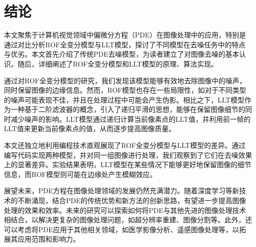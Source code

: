 \titleformat{\chapter}[hang]{\linespread{1}\heiti\sanhao\bfseries\filright}{\thechapter}{1em}{}{}
\chapter{结论}
本文聚焦于计算机视觉领域中偏微分方程（PDE）在图像处理中的应用，特别是通过对比分析ROF全变分模型与LLT模型，探讨了不同模型在去噪任务中的特点与优劣。本文首先介绍了传统PDE去噪模型，为读者建立了对图像去噪的基本认识。随后，详细阐述了ROF全变分模型和LLT模型的原理、算法实现。

通过对ROF全变分模型的研究，我们发现该模型能够有效地去除图像中的噪声，同时保留图像的边缘信息。然而，ROF模型也存在一些局限性，如对于不同类型的噪声可能表现不佳，并且在处理过程中可能会产生伪影。相比之下，LLT模型作为一种基于二阶滤波器的概念，引入了递归平滑的思想，能够在保留图像细节的同时减少噪声的影响。LLT模型通过递归计算当前像素点的LLT值，并利用前一帧的LLT值来更新当前像素点的值，从而逐步提高图像质量。

本文还独立地利用编程技术直观展现了ROF全变分模型与LLT模型的差异。通过编写代码实现两种模型，并对同一组图像进行处理，我们观察到了它们在去噪效果上的显著差异。实验结果表明，LLT模型在某些情况下能够更好地保留图像的细节信息，而ROF模型则可能在边缘处产生模糊效应。

展望未来，PDE方程在图像处理领域的发展仍然充满潜力。随着深度学习等新技术的不断涌现，结合PDE的传统优势和新方法的创新思路，有望进一步提高图像处理的效果和效率。未来的研究可以探索如何将PDE与其他先进的图像处理技术相结合，以解决更复杂的图像处理问题，如超分辨率重建、图像分割等。此外，还可以考虑将PDE应用于其他相关领域，如医学影像分析、遥感图像处理等，以拓展其应用范围和影响力。